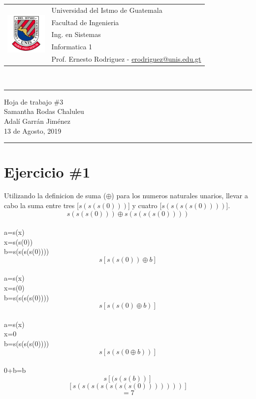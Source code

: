 \documentclass{article}
\newcommand{\horrule}[1]{\rule{\linewidth}{#1}}
\begin{document}
\begin{tabular}{l l}
\multirow{5}{*}{\includegraphics[width=2cm]{escudo.png}} & Universidad del Istmo de Guatemala \\
 & Facultad de Ingenieria \\
 & Ing. en Sistemas \\
 & Informatica 1 \\
 & Prof. Ernesto Rodriguez - \href{mailto:erodriguez@unis.edu.gt}{erodriguez@unis.edu.gt} \\
\end{tabular}
\\

\begin{center}
        \horrule{0.5pt}
        \huge{Hoja de trabajo \#3} \\
        \large{Samantha Rodas Chaluleu}\\
        \large{Adalí Garrán Jiménez}\\
        \large{13 de Agosto, 2019} \\
        \horrule{1pt}
\end{center}
\section*{Ejercicio \#1}
Utilizando la definicion de suma ($\oplus$) para los numeros naturales unarios, llevar
a cabo la suma entre tres [$s(s(s(0)))$] y cuatro [$s(s(s(s(0))))$].\\ 
\[
        s(s(s(0)))\oplus s(s(s(s(0))))
\]\\
        a=s(x)\\
        x=s(s(0))\\
        b=s(s(s(s(0))))
 \[
        s[s(s(0))\oplus b]
\] \\
        a=s(x)\\
        x=s(0)\\
        b=s(s(s(s(0))))
\[
        s[s(s(0)\oplus b)]
\]\\
        a=s(x)\\
        x=0\\
        b=s(s(s(s(0))))
\[
        s[s(s(0\oplus b))]
\]\\
0+b=b
\[
        s[(s(s(b))]
\]
\[
        [s(s(s(s(s(s(s(0)))))))]
\]
\[
        =7
\]
\end{document}
